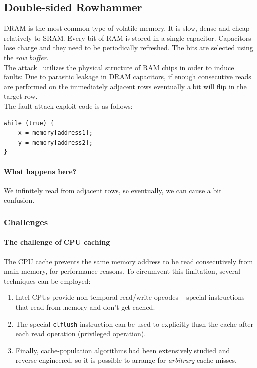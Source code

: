 \subsection{Double-sided Rowhammer}\label{subsec:double_sided_rowhammer}
DRAM is the most common type of volatile memory. It is slow, dense and cheap
relatively to SRAM\@. Every bit of RAM is stored in a single capacitor.
Capacitors lose charge and they need to be periodically refreshed. The bits
are selected using the \emph{row buffer}. \\
The attack~\cite{rowhammer} utilizes the physical structure of RAM chips in
order to induce faults: Due to parasitic leakage in DRAM capacitors, if enough
consecutive reads are performed on the immediately adjacent rows eventually a
bit will flip in the target row. \\
The fault attack exploit code is as follows:
\begin{verbatim}
while (true) {
    x = memory[address1];
    y = memory[address2];
}
\end{verbatim}
\paragraph{What happens here?}
We infinitely read from adjacent rows, so eventually, we can cause a bit confusion.

\subsubsection{Challenges}\label{subsubsec:the_challenge_of_cpu_caching}
\paragraph{The challenge of CPU caching}
The CPU cache prevents the same memory address to be read consecutively from
main memory, for performance reasons. To circumvent this limitation, several
techniques can be employed:
\begin{enumerate}
	\item Intel CPUs provide non-temporal read/write opcodes -- special
	instructions that read from memory and don't get cached.
	\item The special \texttt{clflush} instruction can be used to explicitly
	flush the cache after each read operation (privileged operation).
	\item Finally, cache-population algorithms had been extensively studied and
	reverse-engineered, so it is possible to arrange for \emph{arbitrary} cache
	misses.
\end{enumerate}

